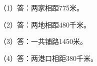 
\begingroup\color{answerred}\par\endgroup
{}
\begingroup\color{answerred}\noindent（1）答：两家相距775米。\par
\noindent（2）答：两地相距480千米。\par
\noindent（3）答：一共铺路1450米。\par
\noindent（4）答：两港口相距380千米。\par\par\endgroup
